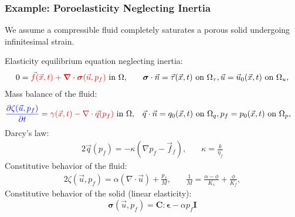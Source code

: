 \documentclass[aspectratio=169,hyperref=colorlinks]{beamer}
\newcommand{\lhs}[1]{{\color{blue}#1}}
\newcommand{\rhs}[1]{{\color{red}#1}}
\newcommand{\tensor}[1]{\bm{#1}}
\begin{document}
\begin{frame}
  \frametitle{Example: Poroelasticity Neglecting Inertia}
  \summary{}

        We assume a compressible fluid completely saturates a porous
        solid undergoing infinitesimal strain.

        Elasticity equilibrium equation neglecting inertia:
        \begin{alignat}{2}
          0 &= \rhs{\vec{f}(\vec{x},t) + \tensor{\nabla} \cdot \tensor{\sigma}(\vec{u},p_f)} \text{ in } \Omega, 
          & \quad
          \tensor{\sigma} \cdot \vec{n} = \vec{\tau}(\vec{x},t) \text{ on } \Omega_\tau, 
          \vec{u} = \vec{u}_0(\vec{x},t) \text{ on } \Omega_u,
        \end{alignat}
        Mass balance of the fluid:
        \begin{alignat}{2}
          \lhs{\frac{\partial \zeta(\vec{u},p_f)}{\partial t}} = \rhs{\gamma(\vec{x},t) - \nabla \cdot \vec{q}(p_f)} \text{ in }\Omega,
          & \quad
          \vec{q} \cdot \vec{n} = q_0(\vec{x},t) \text{ on }\Omega_q,
          p_f = p_0(\vec{x},t) \text{ on }\Omega_p,
        \end{alignat}
        Darcy's law:
        \begin{alignat}{2}
          \vec{q}(p_f) = -\kappa (\nabla p_f - \vec{f}_f), 
          & \quad
          \kappa = \frac{k}{\eta_f}
        \end{alignat}
        Constitutive behavior of the fluid:
        \begin{alignat}{2}
          \zeta(\vec{u},p_f) = \alpha (\nabla \cdot \vec{u}) + \frac{p_f}{M}, 
          & \quad
          \frac{1}{M} = \frac{\alpha-\phi}{K_s} + \frac{\phi}{K_f},
        \end{alignat}
        Constitutive behavior of the solid (linear elasticity):
        \begin{equation}
          \tensor{\sigma}(\vec{u},p_f) = \tensor{C} : \tensor{\epsilon} - \alpha p_f \tensor{I}
        \end{equation}


\end{frame}
\end{document}
